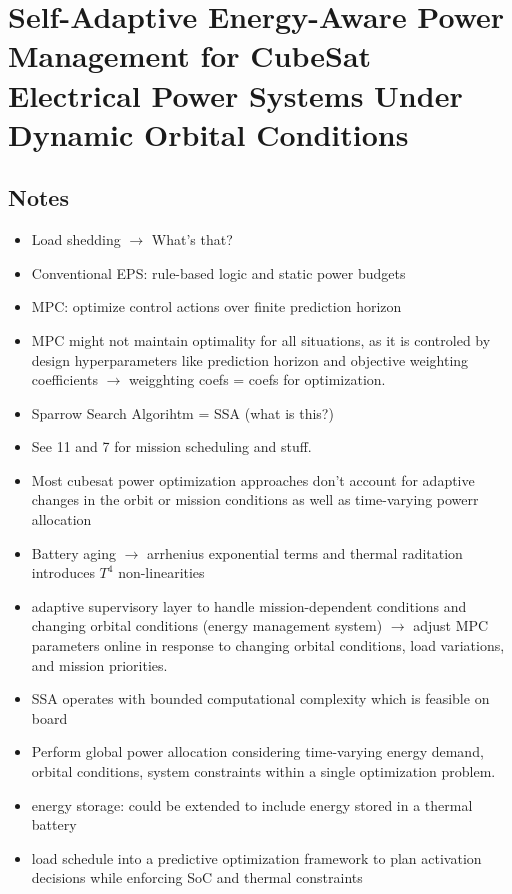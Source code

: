 \documentclass[11pt]{article}
\begin{document}
\section{Self-Adaptive Energy-Aware Power Management for CubeSat Electrical Power Systems Under Dynamic Orbital Conditions} 

\subsection{Notes}

\begin{itemize}[noitemsep]
    \item Load shedding $\rightarrow$ What's that?
    \item Conventional EPS: rule-based logic and static power budgets
    \item MPC: optimize control actions over finite prediction horizon
    \item MPC might not maintain optimality for all situations, as it is controled by design hyperparameters like prediction horizon and objective weighting coefficients $\rightarrow$ weigghting coefs = coefs for optimization.
    \item Sparrow Search Algorihtm = SSA (what is this?)
    \item See 11 and 7 for mission scheduling and stuff. 
    \item Most cubesat power optimization approaches don't account for adaptive changes in the orbit or mission conditions as well as time-varying powerr allocation
    \item Battery aging $\rightarrow$ arrhenius exponential terms and thermal raditation introduces $T^4$ non-linearities
    \item adaptive supervisory layer to handle mission-dependent conditions and changing orbital conditions (energy management system) $\rightarrow$ adjust MPC parameters online in response to changing orbital conditions, load variations, and mission priorities.
    \item SSA operates with bounded computational complexity which is feasible on board
    \item Perform global power allocation considering time-varying energy demand, orbital conditions, system constraints within a single optimization problem.
    \item energy storage: could be extended to include energy stored in a thermal battery
    \item load schedule into a predictive optimization framework to plan activation decisions while enforcing SoC and thermal constraints

\end{itemize}
\end{document}

